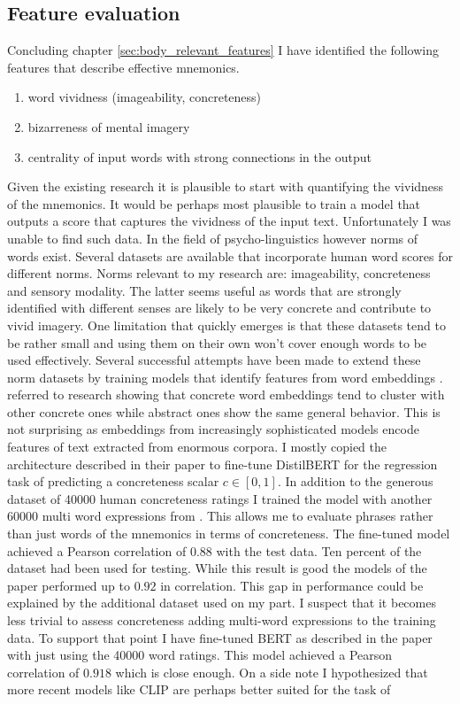 \subsection{Feature evaluation} \label{sec:body_feature_evaluation}

Concluding chapter \ref{sec:body_relevant_features} I have identified the following features that describe effective mnemonics. 
\begin{enumerate}
    \item word vividness (imageability, concreteness)
    \item bizarreness of mental imagery
    \item centrality of input words with strong connections in the output
\end{enumerate}

Given the existing research it is plausible to start with quantifying the vividness of the mnemonics. It would be perhaps most plausible to train a model that outputs a score that captures the vividness of the input text. Unfortunately I was unable to find such data. In the field of psycho-linguistics however norms of words exist. Several datasets are available that incorporate human word scores for different norms. Norms relevant to my research are: imageability, concreteness and sensory modality. The latter seems useful as words that are strongly identified with different senses are likely to be very concrete and contribute to vivid imagery. One limitation that quickly emerges is that these datasets tend to be rather small and using them on their own won't cover enough words to be used effectively. Several successful attempts have been made to extend these norm datasets by training models that identify features from word embeddings \cite{concr_embed_bert, img_concr_svm, fusing_ctx_embed_concr}. \cite{concr_embed_bert} referred to research showing that concrete word embeddings tend to cluster with other concrete ones while abstract ones show the same general behavior. This is not surprising as embeddings from increasingly sophisticated models encode features of text extracted from enormous corpora. I mostly copied the architecture described in their paper to fine-tune DistilBERT for the regression task of predicting a concreteness scalar $c \in [0,1]$. In addition to the generous dataset of 40000 human concreteness ratings \cite{40000_concr} I trained the model with another 60000 multi word expressions from \cite{60000_concr}. This allows me to evaluate phrases rather than just words of the mnemonics in terms of concreteness. The fine-tuned model achieved a Pearson correlation of $0.88$ with the test data. Ten percent of the dataset had been used for testing. While this result is good the models of the paper performed up to $0.92$ in correlation. This gap in performance could be explained by the additional dataset used on my part. I suspect that it becomes less trivial to assess concreteness adding multi-word expressions to the training data. To support that point I have fine-tuned BERT as described in the paper with just using the 40000 word ratings. This model achieved a Pearson correlation of $0.918$ which is close enough. On a side note I hypothesized that more recent models like CLIP are perhaps better suited for the task of 